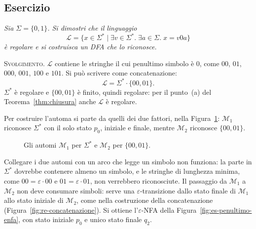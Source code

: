 \documentclass[a4paper, 11pt, oneside]{book}
\makeatletter
\theoremstyle{formale}
\newcommand{\spaziominimo}[1]{%
    \par
    \if@nobreak\else
        \ifdim\pagegoal<\maxdimen
            \ifdim\dimexpr\pagegoal-\pagetotal\relax<#1\relax
                \ifdim\pagetotal>\pagegoal\else
                    \newpage
                \fi
            \fi
        \fi
    \fi}
\newcounter{escount}[section]
\newcommand{\esercizio}{
    \spaziominimo{8\baselineskip}%
    \refstepcounter{escount}%
    \subsection*{Esercizio \arabic{escount}}%
}
\makeatother
\begin{document}
    \esercizio
    \textit{Sia $\Sigma = \{0, 1\}$. Si dimostri che il linguaggio
    \begin{equation*}
        \mathcal{L} = \{x \in \Sigma^* \mid \exists v \in \Sigma^*.\; \exists a \in \Sigma.\;
        x = v0a\}
    \end{equation*}
    \`e regolare e si costruisca un DFA che lo riconosce.}

    \textsc{Svolgimento}. $\mathcal{L}$ contiene le stringhe il cui penultimo simbolo \`e
    $0$, come $00$, $01$, $000$, $001$, $100$ e $101$. Si pu\`o scrivere come
    concatenazione:
    \begin{equation*}
        \mathcal{L} = \Sigma^* \cdot \{00, 01\}.
    \end{equation*}
    $\Sigma^*$ \`e regolare e $\{00, 01\}$ \`e finito, quindi regolare: per il punto~(a)
    del Teorema~\ref{thm:chiusura} anche $\mathcal{L}$ \`e regolare.

    Per costruire l'automa si parte da quelli dei due fattori, nella
    Figura~\ref{fig:es-penultimo-fattori}: $\mathcal{M}_1$ riconosce $\Sigma^*$ con il solo
    stato $p_0$, iniziale e finale, mentre $\mathcal{M}_2$ riconosce $\{00, 01\}$.

    \begin{figure}[H]
        \centering
        \caption{Gli automi $\mathcal{M}_1$ per $\Sigma^*$ e $\mathcal{M}_2$ per
            $\{00, 01\}$.}
        \label{fig:es-penultimo-fattori}
    \end{figure}

    Collegare i due automi con un arco che legge un simbolo non funziona: la parte in
    $\Sigma^*$ dovrebbe contenere almeno un simbolo, e le stringhe di lunghezza minima,
    come $00 = \varepsilon \cdot 00$ e $01 = \varepsilon \cdot 01$, non verrebbero
    riconosciute. Il passaggio da $\mathcal{M}_1$ a $\mathcal{M}_2$ non deve consumare
    simboli: serve una $\varepsilon$-transizione dallo stato finale di $\mathcal{M}_1$
    allo stato iniziale di $\mathcal{M}_2$, come nella costruzione della concatenazione
    (Figura~\ref{fig:re-concatenazione}). Si ottiene l'$\varepsilon$-NFA della
    Figura~\ref{fig:es-penultimo-enfa}, con stato iniziale $p_0$ e unico stato finale
    $q_2$.
\end{document}
